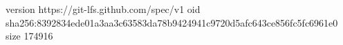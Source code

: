 version https://git-lfs.github.com/spec/v1
oid sha256:8392834ede01a3aa3c63583da78b9424941c9720d5afc643ce856fc5fc6961e0
size 174916
